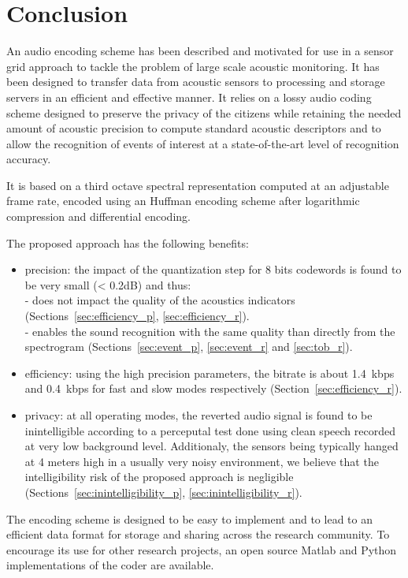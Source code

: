 \documentclass[sensors,article,submit,moreauthors,pdftex,10pt,a4paper]{mdpi}
\begin{document}
\section{Conclusion}

An audio encoding scheme has been described and motivated for use in a sensor grid approach to tackle the problem of large scale acoustic monitoring. It has been designed to transfer data from acoustic sensors to processing and storage servers in an efficient and effective manner. It relies on a lossy audio coding scheme designed to preserve the privacy of the citizens while retaining the needed amount of acoustic precision to compute standard acoustic descriptors and to allow the recognition of events of interest at a state-of-the-art level of recognition accuracy.

It is based on a third octave spectral representation computed at an adjustable frame rate, encoded using an Huffman encoding scheme after logarithmic compression and differential encoding.

The proposed approach has the following benefits:
\begin{itemize}
	\item precision: the impact of the quantization step for 8 bits codewords is found to be very small (< 0.2dB) and thus:\\
	- does not impact the quality of the acoustics indicators (Sections~\ref{sec:efficiency_p}, \ref{sec:efficiency_r}).\\
	- enables the sound recognition with the same quality than directly from the spectrogram (Sections~\ref{sec:event_p}, \ref{sec:event_r} and \ref{sec:tob_r}).
	\item efficiency: using the high precision parameters, the bitrate is about 1.4~kbps and 0.4~kbps for fast and slow modes respectively (Section~\ref{sec:efficiency_r}).
	\item privacy: at all operating modes, the reverted audio signal is found to be inintelligible according to a perceputal test done using clean speech recorded at very low background level. Additionaly, the sensors being typically hanged at 4 meters high in a usually very noisy environment, we believe that the intelligibility risk of the proposed approach is negligible (Sections~\ref{sec:inintelligibility_p}, \ref{sec:inintelligibility_r}).
\end{itemize}

The encoding scheme is designed to be easy to implement and to lead to an efficient data format for storage and sharing across the research community. To encourage its use for other research projects, an open source Matlab and Python implementations of the coder are available.
\end{document}
